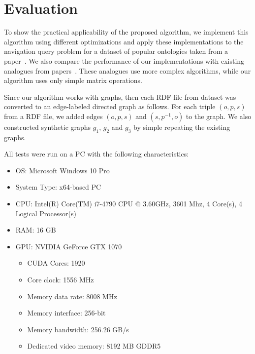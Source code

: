 \section{Evaluation}
To show the practical applicability of the proposed algorithm, we implement this algorithm using different optimizations and apply these implementations to the navigation query problem for a dataset of popular ontologies taken from a paper~\cite{RDF}. We also compare the performance of our implementations with existing analogues from papers~\cite{GLL,RDF}. These analogues use more complex algorithms, while our algorithm uses only simple matrix operations.

Since our algorithm works with graphs, then each RDF file from dataset was converted to an edge-labeled directed graph as follows. For each triple $(o,p,s)$ from a RDF file, we added edges $(o,p,s)$ and $(s,p^{-1},o)$ to the graph. We also constructed synthetic graphs $g_1$, $g_2$ and $g_3$ by simple repeating the existing graphs.

All tests were run on a PC with the following characteristics:
\begin{itemize}
    \item OS: Microsoft Windows 10 Pro
    \item System Type: x64-based PC
    \item CPU: Intel(R) Core(TM) i7-4790 CPU @ 3.60GHz, 3601 Mhz, 4 Core(s), 4 Logical Processor(s)
    \item RAM: 16 GB
    \item GPU: NVIDIA GeForce GTX 1070
    \begin{itemize}
        \item CUDA Cores:		1920 
        \item Core clock:		1556 MHz 
        \item Memory data rate:	8008 MHz
        \item Memory interface:	256-bit 
        \item Memory bandwidth:	256.26 GB/s
        \item Dedicated video memory:	8192 MB GDDR5
    \end{itemize}
\end{itemize}

